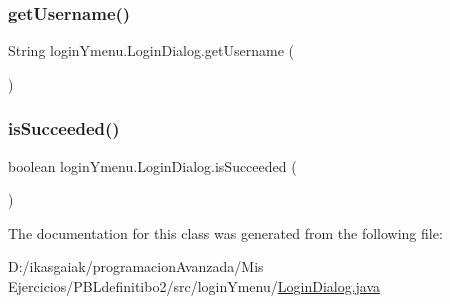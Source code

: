 \subsubsection{\texorpdfstring{get\+Username()}{getUsername()}}
{\footnotesize\ttfamily String login\+Ymenu.\+Login\+Dialog.\+get\+Username (\begin{DoxyParamCaption}{ }\end{DoxyParamCaption})}

\mbox{\label{classlogin_ymenu_1_1_login_dialog_aa6faef4c9a279244ef68afd1e0414c1a}} 
\subsubsection{\texorpdfstring{is\+Succeeded()}{isSucceeded()}}
{\footnotesize\ttfamily boolean login\+Ymenu.\+Login\+Dialog.\+is\+Succeeded (\begin{DoxyParamCaption}{ }\end{DoxyParamCaption})}



The documentation for this class was generated from the following file\+:\begin{DoxyCompactItemize}
\item 
D\+:/ikasgaiak/programacion\+Avanzada/\+Mis Ejercicios/\+P\+B\+Ldefinitibo2/src/login\+Ymenu/\mbox{\hyperlink{_login_dialog_8java}{Login\+Dialog.\+java}}\end{DoxyCompactItemize}
